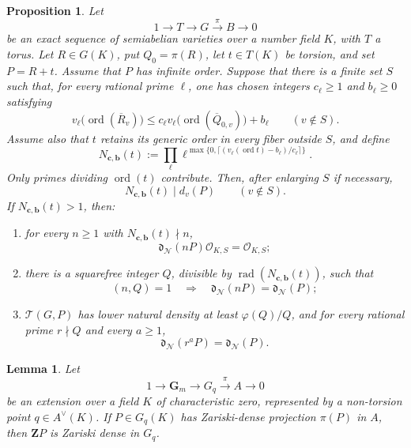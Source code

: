 \documentclass[10pt,a4paper]{amsart}
\newtheorem{proposition}{Proposition}
\newtheorem{lemma}{Lemma}
\newcommand{\Gm}{\mathbf G_m}
\newcommand{\Ner}{\mathcal N}
\newcommand{\cO}{\mathcal O}
\newcommand{\dd}{\mathfrak d}
\newcommand{\ord}{\operatorname{ord}}
\newcommand{\rad}{\operatorname{rad}}
\begin{document}
\begin{proposition}
\label{thm:abstract-shift}
Let
\[
 1\longrightarrow T\longrightarrow G\xrightarrow{\pi}B\longrightarrow0
\]
be an exact sequence of semiabelian varieties over a number field $K$, with
$T$ a torus.  Let $R\in G(K)$, put $Q_0=\pi(R)$, let $t\in T(K)$ be torsion,
and set $P=R+t$.  Assume that $P$ has infinite order.  Suppose that there is a
finite set $S$ such that, for every rational prime $\ell$, one has chosen
integers $c_\ell\ge1$ and $b_\ell\ge0$ satisfying
\begin{equation}\label{eq:abstract-local-control}
 v_\ell\bigl(\ord(\overline R_v)\bigr)
 \le c_\ell v_\ell\bigl(\ord(\overline Q_{0,v})\bigr)+b_\ell
 \qquad(v\notin S).
\end{equation}
Assume also that $t$ retains its generic order in every fiber outside $S$, and
define
\begin{equation}\label{eq:abstract-N}
 N_{\mathbf c,\mathbf b}(t):=\prod_\ell
 \ell^{\max\{0,\lceil(v_\ell(\ord t)-b_\ell)/c_\ell\rceil\}}.
\end{equation}
Only primes dividing $\ord(t)$ contribute.  Then, after enlarging $S$ if
necessary,
\[
 N_{\mathbf c,\mathbf b}(t)\mid d_v(P)
 \qquad(v\notin S).
\]
If $N_{\mathbf c,\mathbf b}(t)>1$, then:
\begin{enumerate}[label=\textup{(\roman*)}]
\item for every $n\ge1$ with $N_{\mathbf c,\mathbf b}(t)\nmid n$,
\[
 \dd_{\Ner}(nP)\cO_{K,S}=\cO_{K,S};
\]
\item there is a squarefree integer $Q$, divisible by
$\rad(N_{\mathbf c,\mathbf b}(t))$, such that
\begin{equation}\label{eq:abstract-coprime-return}
 (n,Q)=1\quad\Longrightarrow\quad
 \dd_{\Ner}(nP)=\dd_{\Ner}(P);
\end{equation}
\item $\mathscr T(G,P)$ has lower natural density at least $\varphi(Q)/Q$, and
for every rational prime $r\nmid Q$ and every $a\ge1$,
\[
 \dd_{\Ner}(r^{a}P)=\dd_{\Ner}(P).
\]
\end{enumerate}
\end{proposition}

\begin{lemma}
\label{lem:dense-lift}
Let
\[
 1\longrightarrow\Gm\longrightarrow G_q\xrightarrow{\pi}A\longrightarrow0
\]
be an extension over a field $K$ of characteristic zero, represented by a
non-torsion point $q\in A^\vee(K)$.  If $P\in G_q(K)$ has Zariski-dense
projection $\pi(P)$ in $A$, then $\mathbf ZP$ is Zariski dense in $G_q$.
\end{lemma}
\end{document}
